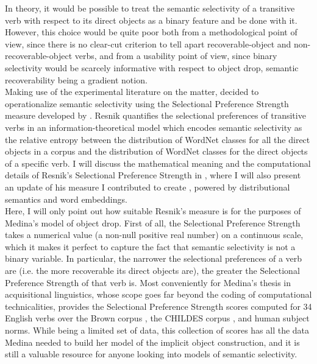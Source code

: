 In theory, it would be possible to treat the semantic selectivity of a transitive verb with respect to its direct objects as a binary feature and be done with it. However, this choice would be quite poor both from a methodological point of view, since there is no clear-cut criterion to tell apart recoverable-object and non-recoverable-object verbs, and from a usability point of view, since binary selectivity would be scarcely informative with respect to object drop, semantic recoverability being a gradient notion.\\
Making use of the experimental literature on the matter, \textcite{Medina2007} decided to operationalize semantic selectivity using the Selectional Preference Strength measure developed by \textcite{Resnik1993, Resnik1996}. Resnik quantifies the selectional preferences of transitive verbs in an information-theoretical model which encodes semantic selectivity as the relative entropy between the distribution of WordNet \parencite{beckwith1991wordnet, Miller1995} classes for all the direct objects in a corpus and the distribution of WordNet classes for the direct objects of a specific verb. I will discuss the mathematical meaning and the computational details of Resnik's Selectional Preference Strength in , where I will also present an update of his measure I contributed to create \parencite{CappelliLenciPISA}, powered by distributional semantics and word embeddings.\\
Here, I will only point out how suitable Resnik's measure is for the purposes of Medina's model of object drop. First of all, the Selectional Preference Strength takes a numerical value (a non-null positive real number) on a continuous scale, which it makes it perfect to capture the fact that semantic selectivity is not a binary variable. In particular, the narrower the selectional preferences of a verb are (i.e. the more recoverable its direct objects are), the greater the Selectional Preference Strength of that verb is. Most conveniently for Medina's thesis in acquisitional linguistics, whose scope goes far beyond the coding of computational technicalities, \textcite[150]{Resnik1996} provides the Selectional Preference Strength scores computed for 34 English verbs over the Brown corpus \parencite{kucera1967brownCorpus}, the CHILDES corpus \parencite{macwhinney2000childesCorpus}, and human subject norms. While being a limited set of data, this collection of scores has all the data Medina needed to build her model of the implicit object construction, and it is still a valuable resource for anyone looking into models of semantic selectivity.


